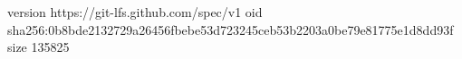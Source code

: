 version https://git-lfs.github.com/spec/v1
oid sha256:0b8bde2132729a26456fbebe53d723245ceb53b2203a0be79e81775e1d8dd93f
size 135825
